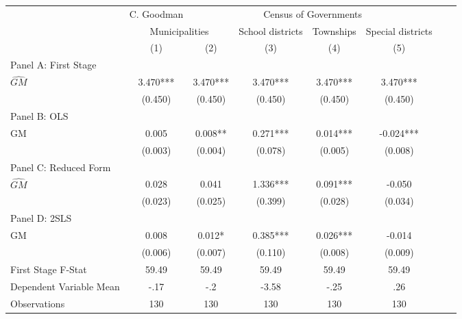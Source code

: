  \begin{tabular}{l*{7}{c}} \toprule
&\multicolumn{1}{c}{C. Goodman}&\multicolumn{4}{c}{Census of Governments}\\\cmidrule(lr){2-2}\cmidrule(lr){3-6}
&\multicolumn{2}{c}{Municipalities}&\multicolumn{1}{c}{School districts}&\multicolumn{1}{c}{Townships}&\multicolumn{1}{c}{Special districts}\\\cmidrule(lr){2-3}\cmidrule(lr){4-6}
&\multicolumn{1}{c}{(1)}&\multicolumn{1}{c}{(2)}&\multicolumn{1}{c}{(3)}&\multicolumn{1}{c}{(4)}&\multicolumn{1}{c}{(5)}\\
\cmidrule(lr){1-6}
\multicolumn{5}{l}{Panel A: First Stage}\\
\cmidrule(lr){1-6}
$\widehat{GM}$  &    3.470***&    3.470***&    3.470***&    3.470***&    3.470***\\
                &  (0.450)   &  (0.450)   &  (0.450)   &  (0.450)   &  (0.450)   \\
\cmidrule(lr){1-6}
\multicolumn{5}{l}{Panel B: OLS}\\
\cmidrule(lr){1-6}
GM              &    0.005   &    0.008** &    0.271***&    0.014***&   -0.024***\\
                &  (0.003)   &  (0.004)   &  (0.078)   &  (0.005)   &  (0.008)   \\
\cmidrule(lr){1-6}
\multicolumn{5}{l}{Panel C: Reduced Form}\\
\cmidrule(lr){1-6}
$\widehat{GM}$  &    0.028   &    0.041   &    1.336***&    0.091***&   -0.050   \\
                &  (0.023)   &  (0.025)   &  (0.399)   &  (0.028)   &  (0.034)   \\
\cmidrule(lr){1-6}
\multicolumn{5}{l}{Panel D: 2SLS}\\
\cmidrule(lr){1-6}
GM              &    0.008   &    0.012*  &    0.385***&    0.026***&   -0.014   \\
                &  (0.006)   &  (0.007)   &  (0.110)   &  (0.008)   &  (0.009)   \\
\midrule
First Stage F-Stat&    59.49   &    59.49   &    59.49   &    59.49   &    59.49   \\
Dependent Variable Mean&     -.17   &      -.2   &    -3.58   &     -.25   &      .26   \\
Observations    &      130   &      130   &      130   &      130   &      130   \\
 \bottomrule \end{tabular}
